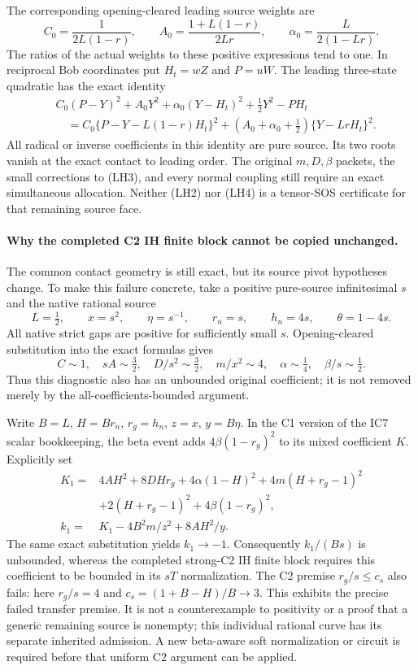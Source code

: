 The corresponding opening-cleared leading source weights are
\[
 C_0=\frac1{2L(1-r)},\qquad
 A_0=\frac{1+L(1-r)}{2Lr},\qquad
 \alpha_0=\frac L{2(1-Lr)}.                              \tag{LH3}
\]
The ratios of the actual weights to these positive expressions
tend to one.  In reciprocal Bob coordinates put $H_t=wZ$ and
$P=uW$.  The leading three-state quadratic has the exact identity
\[
\begin{split}
 &C_0(P-Y)^2+A_0Y^2+\alpha_0(Y-H_t)^2
       +\tfrac12Y^2-PH_t\\
 &\quad=C_0\{P-Y-L(1-r)H_t\}^2
       +(A_0+\alpha_0+\tfrac12)\{Y-LrH_t\}^2.
\end{split}                                             \tag{LH4}
\]
All radical or inverse coefficients in this identity are pure source.
Its two roots vanish at the exact contact to leading order.
The original $m,D,\beta$ packets, the small corrections to (LH3),
and every normal coupling still require an exact simultaneous
allocation.  Neither (LH2) nor (LH4) is a tensor-SOS certificate for
that remaining source face.

\paragraph{Why the completed C2 IH finite block cannot be copied unchanged.}
The common contact geometry is still exact, but its source pivot
hypotheses change. To make this failure concrete, take a positive
pure-source infinitesimal $s$ and the native rational source
\[
 L=\tfrac12,\qquad x=s^2,\qquad\eta=s^{-1},\qquad
 r_n=s,\qquad h_n=4s,\qquad\theta=1-4s.              \tag{LH5}
\]
All native strict gaps are positive for sufficiently small $s$.
Opening-cleared substitution into the exact formulas gives
\[
 C\sim1,\quad sA\sim\tfrac32,\quad
 D/s^2\sim\tfrac32,\quad m/x^2\sim4,\quad
 \alpha\sim\tfrac14,\quad\beta/s\sim\tfrac12.       \tag{LH6}
\]
Thus this diagnostic also has an unbounded original coefficient;
it is not removed merely by the all-coefficients-bounded argument.

Write $B=L$, $H=Br_n$, $r_g=h_n$, $z=x$, $y=B\eta$.
In the C1 version of the IC7 scalar bookkeeping, the beta event
adds $4\beta(1-r_g)^2$ to its mixed coefficient $K$. Explicitly set
\[
\begin{split}
 K_1={}&4AH^2+8DHr_g+4\alpha(1-H)^2
       +4m(H+r_g-1)^2\\
       &+2(H+r_g-1)^2+4\beta(1-r_g)^2,\\
 k_1={}&K_1-4B^2m/z^2+8AH^2/y.
\end{split}                                                   \tag{LH7}
\]
The same exact substitution yields $k_1\to-1$. Consequently
$k_1/(Bs)$ is unbounded, whereas the completed strong-C2 IH
finite block requires this coefficient to be bounded in its
$sT$ normalization. The C2 premise $r_g/s\le c_s$ also fails:
here $r_g/s=4$ and $c_s=(1+B-H)/B\to3$.
This exhibits the precise failed transfer premise. It is not a
counterexample to positivity or a proof that a generic remaining
source is nonempty; this individual rational curve has its separate
inherited admission. A new beta-aware soft normalization or circuit
is required before that uniform C2 argument can be applied.
